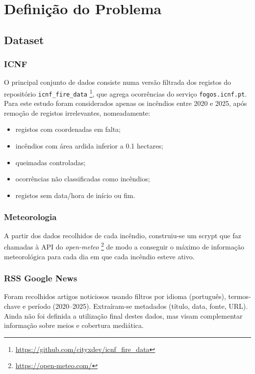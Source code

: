 \section{Definição do Problema}

\subsection{Dataset}

\subsubsection{ICNF}
O principal conjunto de dados consiste numa versão filtrada dos registos do repositório \texttt{icnf\_fire\_data} \footnote{\url{https://github.com/cityxdev/icnf_fire_data}}, que agrega ocorrências do serviço \texttt{fogos.icnf.pt}. Para este estudo foram considerados apenas os incêndios entre 2020 e 2025, após remoção de registos irrelevantes, nomeadamente:
\begin{itemize}
	\item registos com coordenadas em falta;
	\item incêndios com área ardida inferior a 0.1 hectares;
	\item queimadas controladas;
	\item ocorrências não classificadas como incêndios;
	\item registos sem data/hora de início ou fim.
\end{itemize}


\subsubsection{Meteorologia}
A partir dos dados recolhidos de cada incêndio, construiu-se um scrypt que faz chamadas à API do \textit{open-meteo} \footnote{\url{https://open-meteo.com/}} de modo a conseguir o máximo de informação meteorológica para cada dia em que cada incêndio esteve ativo.

\subsubsection{RSS Google News}
Foram recolhidos artigos noticiosos usando filtros por idioma (português), termos-chave e período (2020–2025). Extraíram-se metadados (título, data, fonte, URL). Ainda não foi definida a utilização final destes dados, mas visam complementar informação sobre meios e cobertura mediática.


